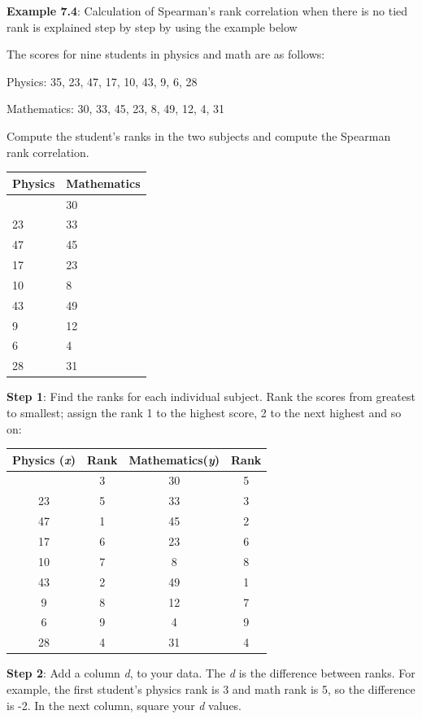 \documentclass[
]{book}
\begin{document}
\textbf{Example 7.4}: Calculation of Spearman's rank correlation when there
is no tied rank is explained step by step by using the example below

The scores for nine students in physics and math are as follows:

Physics: 35, 23, 47, 17, 10, 43, 9, 6, 28

Mathematics: 30, 33, 45, 23, 8, 49, 12, 4, 31

Compute the student's ranks in the two subjects and compute the Spearman
rank correlation.

\begin{longtable}[]{@{}ll@{}}
\toprule\noalign{}
Physics & Mathematics \\
\midrule\noalign{}
\endhead
\bottomrule\noalign{}
\endlastfoot
35 & 30 \\
23 & 33 \\
47 & 45 \\
17 & 23 \\
10 & 8 \\
43 & 49 \\
9 & 12 \\
6 & 4 \\
28 & 31 \\
\end{longtable}

\textbf{Step 1}: Find the ranks for each individual subject. Rank the scores
from greatest to smallest; assign the rank 1 to the highest score, 2 to
the next highest and so on:

\begin{longtable}[]{@{}cccc@{}}
\toprule\noalign{}
Physics (\emph{x}) & Rank & Mathematics(\emph{y}) & Rank \\
\midrule\noalign{}
\endhead
\bottomrule\noalign{}
\endlastfoot
35 & 3 & 30 & 5 \\
23 & 5 & 33 & 3 \\
47 & 1 & 45 & 2 \\
17 & 6 & 23 & 6 \\
10 & 7 & 8 & 8 \\
43 & 2 & 49 & 1 \\
9 & 8 & 12 & 7 \\
6 & 9 & 4 & 9 \\
28 & 4 & 31 & 4 \\
\end{longtable}

\textbf{Step 2}: Add a column \emph{d}, to your data. The \emph{d} is the difference
between ranks. For example, the first student's physics rank is 3 and
math rank is 5, so the difference is -2. In the next column, square your
\emph{d} values.
\end{document}
